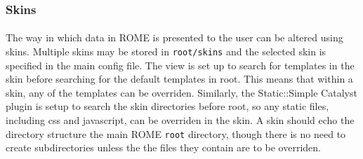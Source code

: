 \subsubsection{Skins}
\label{sec:view_skins}

\paragraph{}
The way in which data in ROME is presented to the user can be altered using skins. Multiple skins may be stored in \texttt{root/skins} and the selected skin is specified in the main config file. The view is set up to search for templates in the skin before searching for the default templates in root. This means that within a skin, any of the templates can be overriden. Similarly, the Static::Simple Catalyst plugin is setup to search the skin directories before root, so any static files, including css and javascript, can be overriden in the skin. A skin should echo the directory structure the main ROME \texttt{root} directory, though there is no need to create subdirectories unless the the files they contain are to be overriden. 

